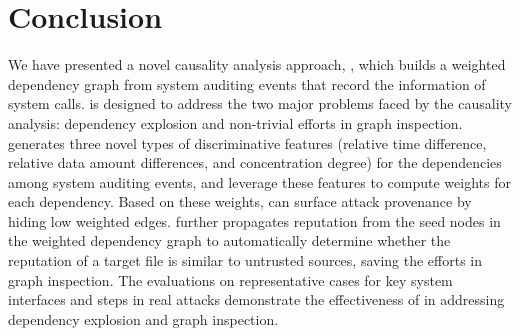 \section{Conclusion}
We have presented a novel causality analysis approach, \tool, which builds a weighted dependency graph from system auditing events that record the information of system calls.
\tool is designed to address the two major problems faced by the causality analysis: dependency explosion and non-trivial efforts in graph inspection.
\tool generates three novel types of discriminative features (\ie relative time difference, relative data amount differences, and concentration degree) for the dependencies among system auditing events, and leverage these features to compute weights for each dependency. 
Based on these weights, \tool can surface attack provenance by hiding low weighted edges.
\tool further propagates reputation from the seed nodes in the weighted dependency graph to automatically determine whether the reputation of a target file is similar to untrusted sources, saving the efforts in graph inspection.
The evaluations on representative cases for key system interfaces and steps in real attacks demonstrate the effectiveness of \tool in addressing dependency explosion and graph inspection.